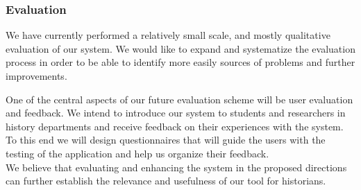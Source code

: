 \subsubsection{Evaluation}

We have currently performed a relatively small scale, and mostly qualitative evaluation of our system. We would like to 
expand and systematize the evaluation process in order to be able to identify more easily sources of problems and further improvements.

One of the central aspects of our future evaluation scheme will be user evaluation and feedback. We intend to introduce our system
to students and researchers in history departments and receive feedback on their experiences with the system.
To this end we will design questionnaires that will guide the users with the testing of the application and help us organize their feedback.\\
 
We believe that evaluating and enhancing the system in the proposed directions can further establish the relevance and usefulness 
of our tool for historians.  

